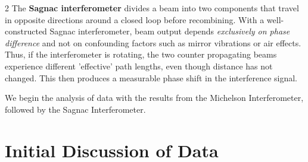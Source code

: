 \documentclass[fontsize=10pt]{article}
\begin{document}
\begin{multicols}{2}
	 The \textbf{Sagnac interferometer} divides a beam into two components that travel in opposite directions around a closed loop before recombining. With a well-constructed Sagnac interferometer, beam output depends \textit{exclusively on phase difference} and not on confounding factors such as mirror vibrations or air effects. Thus, if the interferometer is rotating, the two counter propagating beams experience different 'effective' path lengths, even though distance has not changed. This then produces a measurable phase shift in the interference signal.
     
We begin the analysis of data with the results from the Michelson Interferometer, followed by the Sagnac Interferometer. 




\section{Initial Discussion of Data}


\end{multicols}
\end{document}
